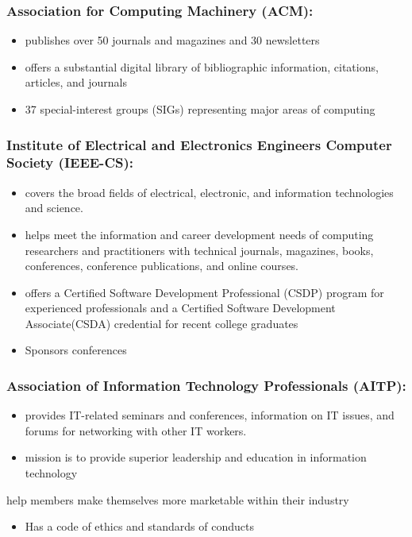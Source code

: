 \documentclass[11pt]{article}
\begin{document}
\subsubsection{Association for Computing Machinery (ACM):}
\label{sec:orgba5f24f}
\begin{itemize}
\item publishes over 50 journals and magazines and 30 newsletters
\item offers a substantial digital library of bibliographic information, citations, articles, and journals
\item 37 special-interest groups (SIGs) representing major areas of computing
\end{itemize}
\subsubsection{Institute of Electrical and Electronics Engineers Computer Society (IEEE-CS):}
\label{sec:org599f6a2}
\begin{itemize}
\item covers the broad fields of electrical, electronic, and information technologies and science.
\item helps meet the information and career development needs of computing researchers and practitioners with technical journals, magazines, books, conferences, conference publications, and online courses.
\item offers a Certified Software Development Professional (CSDP) program for experienced professionals and a Certified Software Development Associate(CSDA) credential for recent college graduates
\item Sponsors conferences
\end{itemize}
\subsubsection{Association of Information Technology Professionals (AITP):}
\label{sec:orge78c482}
\begin{itemize}
\item provides IT-related seminars and conferences, information on IT issues, and forums for networking with other IT workers.
\item mission is to provide superior leadership and education in information technology
\end{itemize}
help members make themselves more marketable within their industry
\begin{itemize}
\item Has a code of ethics and standards of conducts
\end{itemize}
\end{document}
